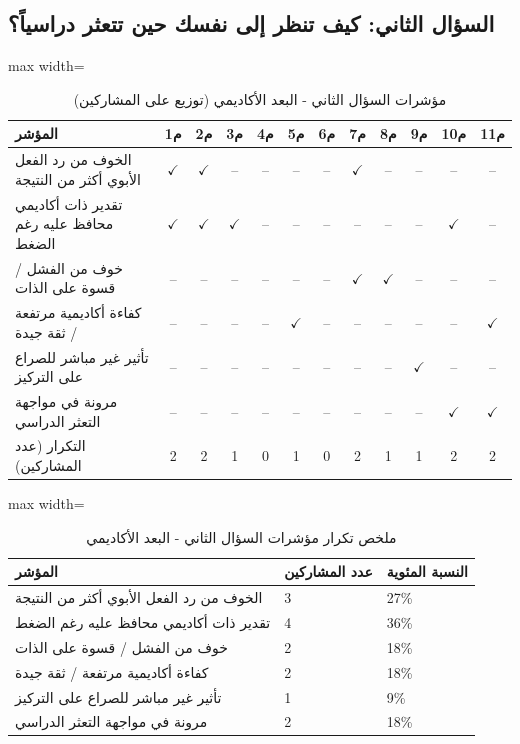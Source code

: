 \documentclass[12pt,oneside]{report}
\begin{document}
\subsection{السؤال الثاني: كيف تنظر إلى نفسك حين تتعثر دراسياً؟}
\begin{table}[H]
\centering
\caption{مؤشرات السؤال الثاني - البعد الأكاديمي (توزيع على المشاركين)}
\scriptsize
\renewcommand{\arraystretch}{1.3}
\setlength{\tabcolsep}{4pt}
\begin{adjustbox}{max width=\textwidth}
\begin{tabular}{l c c c c c c c c c c c}
\toprule
\textbf{المؤشر} & \textbf{م1} & \textbf{م2} & \textbf{م3} & \textbf{م4} & \textbf{م5} & \textbf{م6} & \textbf{م7} & \textbf{م8} & \textbf{م9} & \textbf{م10} & \textbf{م11} \\
\midrule
الخوف من رد الفعل الأبوي أكثر من النتيجة & $\checkmark$ & $\checkmark$ & -- & -- & -- & -- & $\checkmark$ & -- & -- & -- & -- \\
تقدير ذات أكاديمي محافظ عليه رغم الضغط & $\checkmark$ & $\checkmark$ & $\checkmark$ & -- & -- & -- & -- & -- & -- & $\checkmark$ & -- \\
خوف من الفشل / قسوة على الذات & -- & -- & -- & -- & -- & -- & $\checkmark$ & $\checkmark$ & -- & -- & -- \\
كفاءة أكاديمية مرتفعة / ثقة جيدة & -- & -- & -- & -- & $\checkmark$ & -- & -- & -- & -- & -- & $\checkmark$ \\
تأثير غير مباشر للصراع على التركيز & -- & -- & -- & -- & -- & -- & -- & -- & $\checkmark$ & -- & -- \\
مرونة في مواجهة التعثر الدراسي & -- & -- & -- & -- & -- & -- & -- & -- & -- & $\checkmark$ & $\checkmark$ \\
التكرار (عدد المشاركين) & 2 & 2 & 1 & 0 & 1 & 0 & 2 & 1 & 1 & 2 & 2 \\
\bottomrule
\end{tabular}
\end{adjustbox}
\end{table}
\begin{table}[H]
\centering
\caption{ملخص تكرار مؤشرات السؤال الثاني - البعد الأكاديمي}
\small
\renewcommand{\arraystretch}{1.3}
\setlength{\tabcolsep}{4pt}
\begin{adjustbox}{max width=\textwidth}
\begin{tabular}{p{6cm} p{4cm} p{4cm}}
\toprule
\textbf{المؤشر} & \textbf{عدد المشاركين} & \textbf{النسبة المئوية} \\
\midrule
الخوف من رد الفعل الأبوي أكثر من النتيجة & 3 & 27\% \\
تقدير ذات أكاديمي محافظ عليه رغم الضغط & 4 & 36\% \\
خوف من الفشل / قسوة على الذات & 2 & 18\% \\
كفاءة أكاديمية مرتفعة / ثقة جيدة & 2 & 18\% \\
تأثير غير مباشر للصراع على التركيز & 1 & 9\% \\
مرونة في مواجهة التعثر الدراسي & 2 & 18\% \\
\bottomrule
\end{tabular}
\end{adjustbox}
\end{table}
\end{document}
